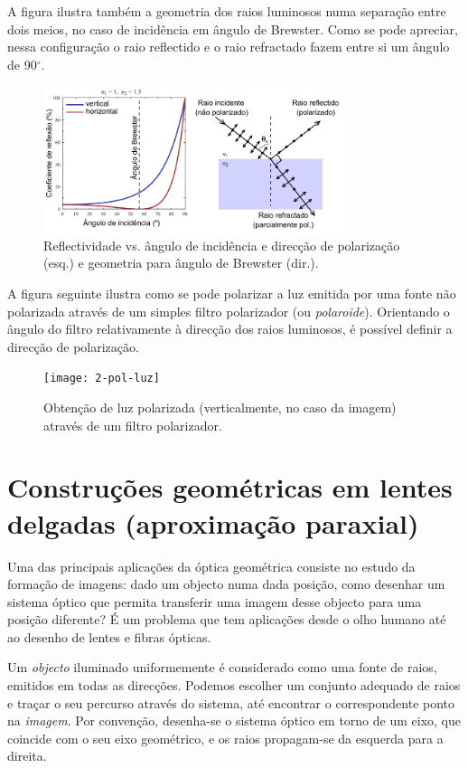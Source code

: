 \documentclass[a4paper,12pt]{article}      %
\begin{document}
A figura ilustra também a geometria dos raios luminosos numa separação entre dois meios, no caso de incidência em ângulo de Brewster. Como se pode apreciar, nessa configuração o raio reflectido e o raio refractado fazem entre si um ângulo de 90$^\circ$.

\begin{figure}
	[!hb]  \centering 
	\includegraphics[width=0.8\textwidth]{2-brewster}
	\caption{Reflectividade vs. ângulo de incidência e direcção de polarização (esq.) e geometria para ângulo de Brewster (dir.). \label{fig:brewster}} 
\end{figure}

A figura seguinte ilustra como se pode polarizar a luz emitida por uma fonte não polarizada através de um simples filtro polarizador (ou \textit{polaroide}). Orientando o ângulo do filtro relativamente à direcção dos raios luminosos, é possível definir a direcção de polarização.

\begin{figure}
	[!hb]  \centering 
	\texttt{[image: 2-pol-luz]}
	\caption{Obtenção de luz polarizada (verticalmente, no caso da imagem) através de um filtro polarizador. \label{fig:pol-luz}} 
\end{figure}


\section{\sf Construções geométricas em lentes delgadas (aproximação paraxial)}

Uma das principais aplicações da óptica geométrica consiste no estudo da formação de imagens: dado um objecto numa dada posição, como desenhar um sistema óptico que permita transferir uma imagem desse objecto para uma posição diferente? É um problema que tem aplicações desde o olho humano até ao desenho de lentes e fibras ópticas.

 Um \emph{objecto} iluminado uniformemente é considerado como uma fonte de raios, emitidos em todas as direcções. Podemos escolher um conjunto adequado de raios e traçar o seu percurso através do sistema, até encontrar o correspondente ponto na \emph{imagem}. Por convenção, desenha-se o sistema óptico em torno de um eixo, que coincide com o seu eixo geométrico, e os raios propagam-se da esquerda para a direita. 
\end{document}
